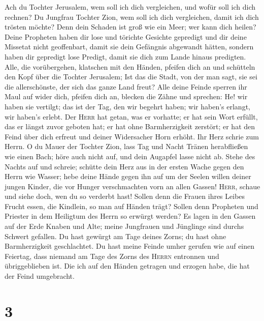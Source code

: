  Ach du Tochter Jerusalem, wem soll ich dich vergleichen,
und wofür soll ich dich rechnen? Du Jungfrau Tochter Zion, wem soll ich
dich vergleichen, damit ich dich trösten möchte? Denn dein Schaden ist
groß wie ein Meer; wer kann dich heilen?  Deine Propheten
haben dir lose und törichte Gesichte gepredigt und dir deine Missetat
nicht geoffenbart, damit sie dein Gefängnis abgewandt hätten, sondern
haben dir gepredigt lose Predigt, damit sie dich zum Lande hinaus
predigten.  Alle, die vorübergehen, klatschen mit den
Händen, pfeifen dich an und schütteln den Kopf über die Tochter
Jerusalem; Ist das die Stadt, von der man sagt, sie sei die
allerschönste, der sich das ganze Land freut?  Alle deine
Feinde sperren ihr Maul auf wider dich, pfeifen dich an, blecken die
Zähne und sprechen: He! wir haben sie vertilgt; das ist der Tag, den wir
begehrt haben; wir haben's erlangt, wir haben's erlebt. 
Der \textsc{Herr} hat getan, was er vorhatte; er hat sein Wort erfüllt,
das er längst zuvor geboten hat; er hat ohne Barmherzigkeit zerstört; er
hat den Feind über dich erfreut und deiner Widersacher Horn erhöht.
 Ihr Herz schrie zum Herrn. O du Mauer der Tochter Zion,
lass Tag und Nacht Tränen herabfließen wie einen Bach; höre auch nicht
auf, und dein Augapfel lasse nicht ab.  Stehe des Nachts
auf und schreie; schütte dein Herz aus in der ersten Wache gegen den
Herrn wie Wasser; hebe deine Hände gegen ihn auf um der Seelen willen
deiner jungen Kinder, die vor Hunger verschmachten vorn an allen Gassen!
 \textsc{Herr}, schaue und siehe doch, wen du so verderbt
hast! Sollen denn die Frauen ihres Leibes Frucht essen, die Kindlein, so
man auf Händen trägt? Sollen denn Propheten und Priester in dem
Heiligtum des Herrn so erwürgt werden?  Es lagen in den
Gassen auf der Erde Knaben und Alte; meine Jungfrauen und Jünglinge sind
durchs Schwert gefallen. Du hast gewürgt am Tage deines Zorns; du hast
ohne Barmherzigkeit geschlachtet.  Du hast meine Feinde
umher gerufen wie auf einen Feiertag, dass niemand am Tage des Zorns des
\textsc{Herrn} entronnen und übriggeblieben ist. Die ich auf den Händen
getragen und erzogen habe, die hat der Feind umgebracht.

\hypertarget{section-2}{%
\section{3}\label{section-2}}

